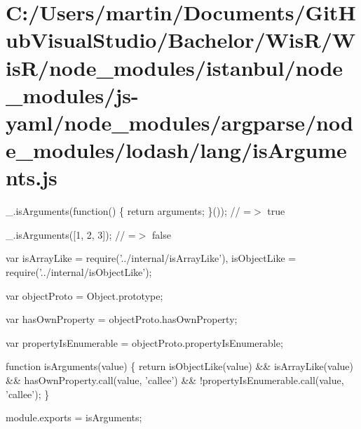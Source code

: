 \hypertarget{_c_1_2_users_2martin_2_documents_2_git_hub_visual_studio_2_bachelor_2_wis_r_2_wis_r_2node_modulee8a43435dff201322bd451c9cbe6b122}{}\section{C\+:/\+Users/martin/\+Documents/\+Git\+Hub\+Visual\+Studio/\+Bachelor/\+Wis\+R/\+Wis\+R/node\+\_\+modules/istanbul/node\+\_\+modules/js-\/yaml/node\+\_\+modules/argparse/node\+\_\+modules/lodash/lang/is\+Arguments.\+js}
\+\_\+.\+is\+Arguments(function() \{ return arguments; \}()); // =$>$ true

\+\_\+.\+is\+Arguments(\mbox{[}1, 2, 3\mbox{]}); // =$>$ false


\begin{DoxyCodeInclude}
var isArrayLike = require(\textcolor{stringliteral}{'../internal/isArrayLike'}),
    isObjectLike = require(\textcolor{stringliteral}{'../internal/isObjectLike'});

var objectProto = Object.prototype;

var hasOwnProperty = objectProto.hasOwnProperty;

var propertyIsEnumerable = objectProto.propertyIsEnumerable;

\textcolor{keyword}{function} isArguments(value) \{
  \textcolor{keywordflow}{return} isObjectLike(value) && isArrayLike(value) &&
    hasOwnProperty.call(value, \textcolor{stringliteral}{'callee'}) && !propertyIsEnumerable.call(value, \textcolor{stringliteral}{'callee'});
\}

module.exports = isArguments;
\end{DoxyCodeInclude}
 